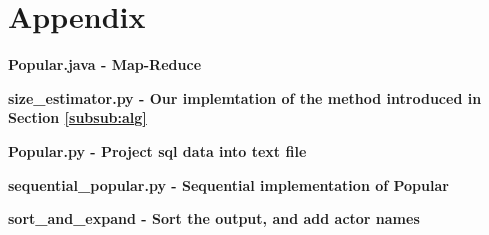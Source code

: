 \documentclass[a4paper,11pt]{article}
\begin{document}
\section*{Appendix}
\textbf{Popular.java - Map-Reduce}

\textbf{size\_estimator.py - Our implemtation of the method introduced in Section \ref{subsub:alg}}

\textbf{Popular.py - Project sql data into text file}

\textbf{sequential\_popular.py - Sequential implementation of Popular}

\textbf{sort\_and\_expand - Sort the output, and add actor names}

\end{document}
